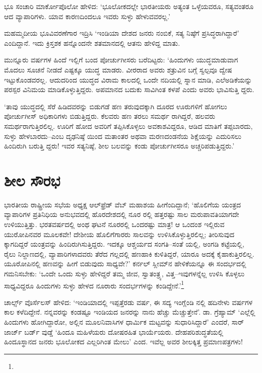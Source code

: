 ಭೂ ಸಂಚಾರಿ ಮಾರ್ಕೋಪೊಲೋ ಹೇಳಿದ: ‘ಭೂಲೋಕದಲ್ಲೇ ಭಾರತೀಯರು ಅತ್ಯಂತ ಒಳ್ಳೆಯವರೂ, ಸತ್ಯವಂತರೂ ಆದ ವ್ಯಾಪಾರಿಗಳು. ಯಾವ ಕಾರಣದಿಂದಲೂ ಇವರು ಸುಳ್ಳು ಹೇಳುವವರಲ್ಲ.’

ಮಹಮ್ಮದೀಯ ಭೂವಿವರಣೆಗಾರ ಇದ್ರಿಸಿ ‘ಇಂಡಿಯಾ ದೇಶದ ಜನರು ನಂಬಿಕೆ, ಸತ್ಯ ನಿಷ್ಠೆಗೆ ಪ್ರಸಿದ್ಧರಾಗಿದ್ದಾರೆ’ ಎಂದಿದ್ದಾನೆ. ಇದು ಕ್ರಿಸ್ತಶಕ ಹನ್ನೊಂದನೇ ಶತಮಾನದಲ್ಲಿ ಆತನು ಹೇಳಿದ್ದ ಮಾತು.

ಮುನ್ನೂರು ವರ್ಷಗಳ ಹಿಂದೆ ಇಲ್ಲಿಗೆ ಬಂದ ಪೋರ್ಚುಗೀಸರು ಬರೆದಿಟ್ಟರು: ‘ಹಿಂದುಗಳು ಯುದ್ಧಮಾಡುವಾಗ ಮೊದಲು ಸೂಚನೆ ನೀಡದೆ ಎಷ್ಟಕ್ಕೂ ಯುದ್ಧ ಮಾಡರು. ವೀರರಾದ ಅವರು ಶತ್ರುವಿನ ಬಗ್ಗೆ ಸ್ವಲ್ಪವೂ ದ್ವೇಷ ಇಟ್ಟುಕೊಂಡವರಲ್ಲ. ಆದುದರಿಂದ ಯುದ್ಧದ ವಿರಾಮ ಕಾಲದಲ್ಲಿ ಒಂದೇ ನದಿಯಲ್ಲಿ ಸ್ನಾನ ಮಾಡಿ, ಎಲೆಅಡಿಕೆಯನ್ನು ಪರಸ್ಪರ ವಿನಿಮಯ ಮಾಡಿಕೊಳ್ಳುತ್ತಿದ್ದರು. ಅಪಮಾನದ ಬದುಕು ಸಾವಿಗಿಂತ ಕಳಪೆ ಎಂದು ಅವರು ಭಾವಿಸುತ್ತಿ ದ್ದರು.

‘ತಾವು ಯುದ್ಧದಲ್ಲಿ ಸೆರೆ ಹಿಡಿದವರನ್ನು ಬಿಡುಗಡೆ ಹಣ ತರುವುದಕ್ಕಾಗಿ ದೂರದ ಊರುಗಳಿಗೆ ಹೋಗಲು ಪೋರ್ಚುಗೀಸ್ ಅಧಿಕಾರಿಗಳು ಬಿಡುತ್ತಿದ್ದರು. ಕೆಲವರು ಹಣ ತರಲು ಸಮರ್ಥ ರಾಗಿದ್ದರೆ, ಹಲವರು ಸಮರ್ಥರಾಗುತ್ತಿರಲಿಲ್ಲ. ಊರಿಗೆ ಹೋದ ಅವರಿಗೆ ತಪ್ಪಿಸಿಕೊಳ್ಳಲು ಅವಕಾಶವಿದ್ದರೂ, ಆಡಿದ ಮಾತಿಗೆ ತಪ್ಪಬಾರದು, ಸುಳ್ಳು ಹೇಳಬಾರದು–ಎಂಬ ದೃಢನಿಷ್ಠೆ ಯಿಂದ ಮತಾಂತರ ಅಥವಾ ಮರಣದಂಡನೆಯ ಶಿಕ್ಷೆಯನ್ನು ಎದುರಿಸಲು ಹಿಂದಿರುಗಿ ಬರುತ್ತಿ ದ್ದರು! ಇವರ ಸತ್ಯನಿಷ್ಠೆ, ಶೀಲ ಬಲವನ್ನು ಕಂಡು ಪೋರ್ಚುಗೀಸರೂ ಅಚ್ಚರಿಪಡುತ್ತಿದ್ದರು.’


\section{ಶೀಲ ಸೌರಭ}

ಭಾರತೀಯ ರಾಷ್ಟ್ರೀಯ ಸಭೆಯ ಅಧ್ಯಕ್ಷ ಆಲ್​ಫ್ರೆಡ್ ವೆಬ್ ಮಹಾಶಯ ಹೀಗೆಂದಿದ್ದಾನೆ; ‘ಹೊಲಿಗೆಯ ಯಂತ್ರದ ವ್ಯಾಪಾರಿಗಳ ಪ್ರತಿನಿಧಿಯ ಅನುಭವದಲ್ಲಿ ಹೊರದೇಶದಲ್ಲಿ ನೂರ ರಲ್ಲಿ ಹತ್ತರಷ್ಟು ಸಾಲ ಮರುಪಾವತಿಯಾಗದೇ ಉಳಿಯುತ್ತಿತ್ತು. ಭರತವರ್ಷದಲ್ಲಿ ಅಂಥ ಘಟನೆ ನೂರರಲ್ಲಿ ಒಂದರಷ್ಟು ಮಾತ್ರ! ಆ ಒಂದಂಶ ಇಲ್ಲಿರುವ ಯುರೋಪಿನವರ ಮೂಲಕವೇ! ದೇಶೀಯ ಹೊಲಿಗೆಗಾರರು ಸಾಲವನ್ನು ಉಳಿಸಿಕೊಳ್ಳುತ್ತಿರಲಿಲ್ಲ; ತೀರಿಸುವುದ ಕ್ಕಾಗದಿದ್ದರೆ ಯಂತ್ರವನ್ನು ಹಿಂದಿರುಗಿಸುತ್ತಿದ್ದರು. ಇದಕ್ಕೂ ಆಶ್ಚರ್ಯದ ಸಂಗತಿ–ಸಂತೆ ಯಲ್ಲಿ, ಅಂಗಡಿ ಕಟ್ಟೆಯಲ್ಲಿ, ರೈಲು ನಿಲ್ದಾಣದಲ್ಲಿ, ವ್ಯಾಪಾರಿಗಳಾದವರು ತೆರೆದ ಗಲ್ಲದಲ್ಲಿ ಹಣಹಾಕಿ ಕುಳಿತಿದ್ದರೆ, ಯಾರೂ ಅದಕ್ಕೆ ಕೈಹಾಕುತ್ತಿರಲಿಲ್ಲ. ಯೂರೋಪಿನಲ್ಲಿ ಹಣವನ್ನು ಹೀಗೆ ಬಿಡುವುದು ಸಾಧ್ಯವೇ?’ ಕರ್ನಲ್ ಸ್ಲೀಮ್​ನ ಹೇಳಿಕೆಯನ್ನೂ ಈ ಸಂದರ್ಭದಲ್ಲಿ ಗಮನಿಸಬೇಕು: ‘ಒಂದೇ ಒಂದು ಸುಳ್ಳು ಹೇಳಿದ್ದರೆ ತಮ್ಮ ಜೀವ, ಸ್ವಾತಂತ್ರ್ಯ, ವಿತ್ತ–ಇವುಗಳನ್ನೆಲ್ಲ ಉಳಿಸಿ ಕೊಳ್ಳಲು ಸಾಧ್ಯವಿದ್ದರೂ ಹಿಂದುಗಳು ಸುಳ್ಳು ಹೇಳದ ನೂರಾರು ಸಂದರ್ಭಗಳನ್ನು ಕಂಡಿದ್ದೇನೆ.’\footnote{\hfill{}}

ಚಾರ್ಲ್ಸ್ ವೊರ್ಸೆಲಸ್ ಹೇಳಿದ: ‘ಇಂಡಿಯಾದಲ್ಲಿ ಇಪ್ಪತ್ತೆರಡು ವರ್ಷ, ಈ ಸದ್ಯ ಇಂಗ್ಲೆಂಡಿ ನಲ್ಲಿ ಹದಿನೇಳು ವರ್ಷಗಳ ಕಾಲ ಕಳೆದಿದ್ದೇನೆ. ನನ್ನವರನ್ನು ಕಂಡಷ್ಟೂ ಇಂಡಿಯದ ಜನರನ್ನು ನಾನು ಹೆಚ್ಚು ಮೆಚ್ಚುತ್ತೇನೆ’. ಡಾ. ಗ್ರೆಹ್ಯಾಮ್ ‘ಎಲ್ಲೆಲ್ಲಿ ಹಿಂದುಗಳು ಹೋಗಿದ್ದಾರೋ, ಅಲ್ಲಿನ ಮೂಲನಿವಾಸಿಗಳ ಧಾರ್ಮಿಕ ಮಟ್ಟವನ್ನು ಸುಧಾರಿಸಿದ್ದಾರೆ’ ಎಂದರೆ, ಸಾರ್ ಜಾರ್ಜ್ ಬರ್ಡ್ ವುಡ್ಡೆ ‘ಹಿಂದೂ ಮಹಿಳೆಯರು ದೋಷರಹಿತ ಭಾರ್ಯೆಯರು. ದೇಹಪರಿಶುದ್ಧತೆಯಲ್ಲಿ ಹಿಂದೂಸ್ಥಾನದ ಜನರು ಭೂಲೋಕದ ಎಲ್ಲರಿಗಿಂತ ಮೇಲು’ ಎಂದ. ಇವೆಲ್ಲ ಅವರ ಶೀಲಕ್ಕಿತ್ತ ಪ್ರಮಾಣಪತ್ರಗಳು!

